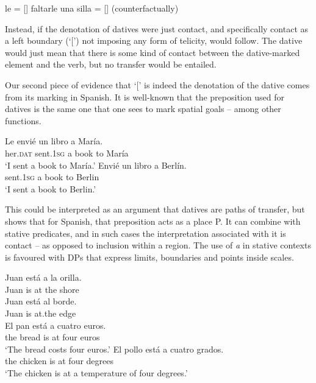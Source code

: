 \documentclass[output=paper,colorlinks,citecolor=brown,nonflat]{langsci/langscibook}
\begin{document}
\ea%
    \label{ex:fabregas:20}
    \ea\label{ex:fabregas:20a}
    le              =     [{\midline}]
    \ex\label{ex:fabregas:20b}
    faltarle una silla    =    [{\midline}] (counterfactually)
    \z
\z

Instead, if the denotation of datives were just contact, and specifically contact as a left boundary (‘[') not imposing any form of telicity,  would follow. The dative would just mean that there is some kind of contact between the dative-marked element and the verb, but no transfer would be entailed.

Our second piece of evidence that ‘[' is indeed the denotation of the dative comes from its marking in Spanish. It is well-known that the preposition used for datives  is the same one that one sees to mark spatial goals  – among other functions.

\ea%
    \label{ex:fabregas:21}
    \ea\label{ex:fabregas:21a}
    \gll    Le     envié     un libro  a  María.\\
            {her.}\textsc{dat}  {sent.1}\textsc{sg}     {a}   {book} {to} {María}\\
    \glt `I sent a book to María.'
    \ex\label{ex:fabregas:21b}
    \gll    Envié     un libro a  Berlín.\\
            {sent.1}\textsc{sg}    {a}  {book} {to} {Berlin}\\
    \glt `I sent a book to Berlin.'
    \z
\z

This could be interpreted as an argument that datives are paths of transfer, but \citet{Fábregas2007} shows that for Spanish, that preposition acts as a place P. It can combine with stative predicates, and in such cases the interpretation associated with it is contact – as opposed to inclusion within a region. The use of \textit{a} in stative contexts is favoured with DPs that express limits, boundaries and points inside scales.

\ea%
    \label{ex:fabregas:22}
    \ea\label{ex:fabregas:22a}
    \gll    Juan está a   la    orilla.\\
            {Juan} {is}    {at} {the} {shore}\\
    \ex\label{ex:fabregas:22b}
    \gll    Juan está al      borde.\\
            {Juan} {is}    {at.the} {edge}\\
    \ex\label{ex:fabregas:22c}
    \gll    El   pan    está   a  cuatro   euros.\\
            {the} {bread} {is}   {at} {four}    {euros}\\
    \glt `The bread costs four euros.'
    \ex\label{ex:fabregas:22d}
    \gll    El   pollo     está a cuatro grados.\\
            {the}  {chicken}   {is}    {at} {four}     {degrees}\\
    \glt `The chicken is at a temperature of four degrees.'
    \z
\z
\end{document}
